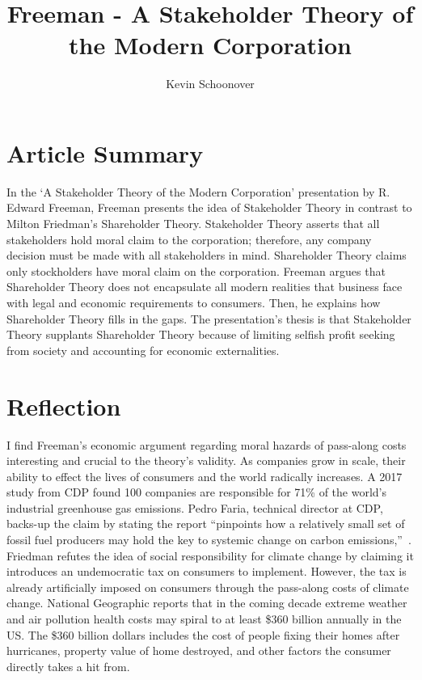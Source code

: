 \documentclass[12pt]{article}
\begin{document}
\title{Freeman - A Stakeholder Theory of the Modern Corporation}
\author{Kevin Schoonover}

\maketitle

\section{Article Summary}
In the `A Stakeholder Theory of the Modern Corporation' presentation by R.
Edward Freeman, Freeman presents the idea of Stakeholder Theory in contrast to
Milton Friedman's Shareholder Theory. Stakeholder Theory asserts that all
stakeholders hold moral claim to the corporation; therefore, any company
decision must be made with all stakeholders in mind. Shareholder Theory claims
only stockholders have moral claim on the corporation. Freeman argues that
Shareholder Theory does not encapsulate all modern realities that business face
with legal and economic requirements to consumers. Then, he explains how
Shareholder Theory fills in the gaps. The presentation's thesis is that
Stakeholder Theory supplants Shareholder Theory because of limiting selfish
profit seeking from society and accounting for economic externalities.

\section{Reflection}

I find Freeman's economic argument regarding moral hazards of pass-along costs
interesting and crucial to the theory's validity. As companies grow in scale,
their ability to effect the lives of consumers and the world radically
increases. A 2017 study from CDP found 100 companies are responsible for 71\% of
the world's industrial greenhouse gas emissions. Pedro Faria, technical director
at CDP, backs-up the claim by stating the report “pinpoints how a relatively
small set of fossil fuel producers may hold the key to systemic change on carbon
emissions,”~\cite{cdp_report}. Friedman refutes the idea of social
responsibility for climate change by claiming it introduces an undemocratic tax
on consumers to implement. However, the tax is already artificially imposed on
consumers through the pass-along costs of climate change. National Geographic
reports that in the coming decade extreme weather and air pollution health costs
may spiral to at least \$360 billion annually in the US\cite{netgeo}. The \$360
billion dollars includes the cost of people fixing their homes after hurricanes,
property value of home destroyed, and other factors the consumer directly takes
a hit from.
\end{document}
